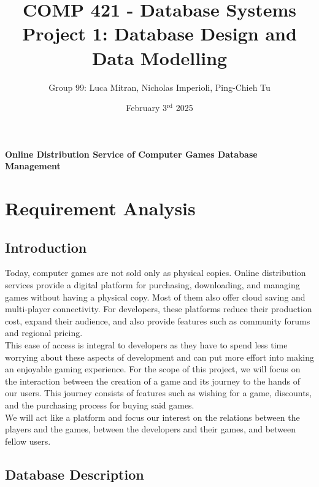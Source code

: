 \documentclass[12pt, oneside]{article}
\title{COMP 421 - Database Systems\\
        \large Project 1: Database Design and Data Modelling}
\author{Group 99: Luca Mitran, Nicholas Imperioli, Ping-Chieh Tu}
\date{February 3$^{\text{rd}}$ 2025}
\begin{document}
\maketitle
\begin{center}
    \large \textbf{Online Distribution Service of Computer Games Database Management}
\end{center}
\section{Requirement Analysis}
\subsection{Introduction}

Today, computer games are not sold only as physical copies. Online distribution services provide a digital platform for purchasing, downloading, and managing games without having a physical copy. Most of them also offer cloud saving and multi-player connectivity. For developers, these platforms reduce their production cost, expand their audience, and also provide features such as community forums and regional pricing.
\vspace{0.5em}
\\
\noindent This ease of access is integral to developers as they have to spend less time worrying about these aspects of development and can put more effort into making an enjoyable gaming experience. For the scope of this project, we will focus on the interaction between the creation of a game and its journey to the hands of our users. This journey consists of features such as wishing for a game, discounts, and the purchasing process for buying said games.
\vspace{0.5em}
\\
\noindent We will act like a platform and focus our interest on the relations between the players and the games, between the developers and their games, and between fellow users. 

\subsection{Database Description}
\end{document}
